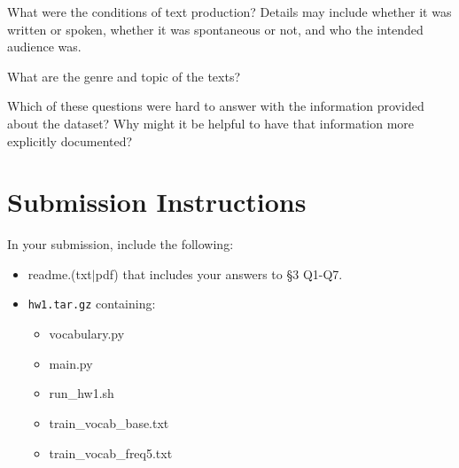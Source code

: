 \documentclass[11pt]{article}
\begin{document}
\vspace{2em}
 What were the conditions of text production?  Details may include whether it was written or spoken, whether it was spontaneous or not, and who the intended audience was.

\vspace{2em}
 What are the genre and topic of the texts?

\vspace{2em}
  Which of these questions were hard to answer with the information provided about the dataset?  Why might it be helpful to have that information more explicitly documented?

\section*{Submission Instructions}

In your submission, include the following:
\begin{itemize}
  \item readme.(txt$\mid$pdf) that includes your answers to \S3 Q1-Q7. 
  \item \texttt{hw1.tar.gz} containing:
  \begin{itemize}
    \item vocabulary.py
    \item main.py
    \item run\_hw1.sh
    \item train\_vocab\_base.txt
    \item train\_vocab\_freq5.txt
  \end{itemize}
\end{itemize}
\end{document}
